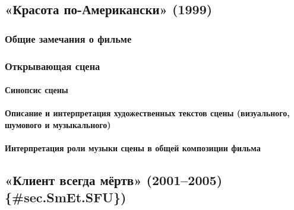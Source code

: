 \subsection{«Красота по-Американски» (1999)}\label{sec.SmEt.AB}

\subsubsection{Общие замечания о фильме}\label{ux43eux431ux449ux438ux435-ux437ux430ux43cux435ux447ux430ux43dux438ux44f-ux43e-ux444ux438ux43bux44cux43cux435-3}

\subsubsection{Открывающая сцена}\label{ux43eux442ux43aux440ux44bux432ux430ux44eux449ux430ux44f-ux441ux446ux435ux43dux430-4}

\paragraph{Синопсис сцены}\label{ux441ux438ux43dux43eux43fux441ux438ux441-ux441ux446ux435ux43dux44b-4}

\paragraph{Описание и интерпретация художественных текстов сцены (визуального, шумового и музыкального)}\label{ux43eux43fux438ux441ux430ux43dux438ux435-ux438-ux438ux43dux442ux435ux440ux43fux440ux435ux442ux430ux446ux438ux44f-ux445ux443ux434ux43eux436ux435ux441ux442ux432ux435ux43dux43dux44bux445-ux442ux435ux43aux441ux442ux43eux432-ux441ux446ux435ux43dux44b-ux432ux438ux437ux443ux430ux43bux44cux43dux43eux433ux43e-ux448ux443ux43cux43eux432ux43eux433ux43e-ux438-ux43cux443ux437ux44bux43aux430ux43bux44cux43dux43eux433ux43e-3}

\paragraph{Интерпретация роли музыки сцены в общей композиции фильма}\label{ux438ux43dux442ux435ux440ux43fux440ux435ux442ux430ux446ux438ux44f-ux440ux43eux43bux438-ux43cux443ux437ux44bux43aux438-ux441ux446ux435ux43dux44b-ux432-ux43eux431ux449ux435ux439-ux43aux43eux43cux43fux43eux437ux438ux446ux438ux438-ux444ux438ux43bux44cux43cux430-3}

\subsection{«Клиент всегда мёртв» (2001--2005) \{\#sec.SmEt.SFU\})}\label{ux43aux43bux438ux435ux43dux442-ux432ux441ux435ux433ux434ux430-ux43cux451ux440ux442ux432-20012005-sec.smet.sfu}

